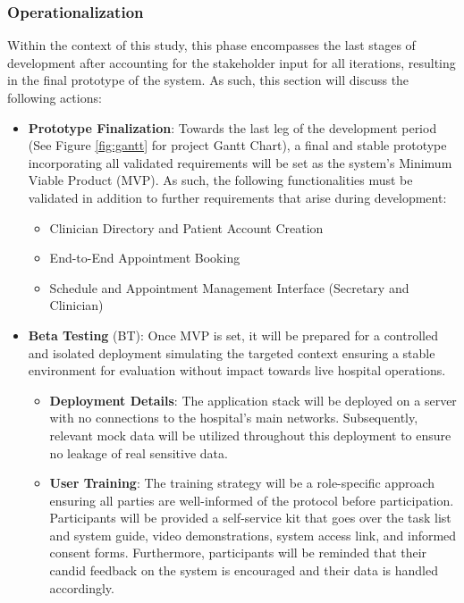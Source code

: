 \documentclass[11pt,a4paper,titlepage]{article}
\begin{document}
	\subsubsection{Operationalization}
	Within the context of this study, this phase encompasses the last stages of development after accounting for the stakeholder input for all iterations, resulting in the final prototype of the system. As such, this section will discuss the following actions: 
	\begin{itemize}
		\item \textbf{Prototype Finalization}: Towards the last leg of the development period (See Figure \ref{fig:gantt} for project Gantt Chart), a final and stable prototype incorporating all validated requirements will be set as the system's Minimum Viable Product (MVP). As such, the following functionalities must be validated in addition to further requirements that arise during development: 
		\begin{itemize}
			\item Clinician Directory and Patient Account Creation 
			\item End-to-End Appointment Booking 
			\item Schedule and Appointment Management Interface (Secretary and Clinician)
		\end{itemize}
		\item \textbf{Beta Testing} (BT): Once MVP is set, it will be prepared for a controlled and isolated deployment simulating the targeted context ensuring a stable environment for evaluation without impact towards live hospital operations. 
		\begin{itemize}
			\item \textbf{Deployment Details}: The application stack will be deployed on a server with no connections to the hospital's main networks. Subsequently, relevant mock data will be utilized throughout this deployment to ensure no leakage of real sensitive data. 
			\item \textbf{User Training}: The training strategy will be a role-specific approach ensuring all parties are well-informed of the protocol before participation. Participants will be provided a self-service kit that goes over the task list and system guide, video demonstrations, system access link, and informed consent forms. Furthermore, participants will be reminded that their candid feedback on the system is encouraged and their data is handled accordingly. 

\end{itemize}
\end{itemize}
\end{document}
